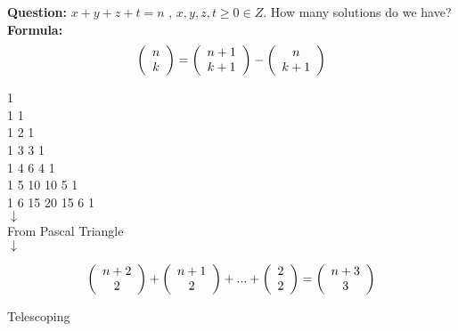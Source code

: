 \documentclass[11pt]{article}
\begin{document}
\textbf{Question: }  $x+y+z+t = n$ , $x,y,z,t \geq 0 \in Z$. How many solutions do we have?
\\ %

\textbf{Formula: }  $$\left( {\begin{array}{*{20}c} n  \\ k  \\ \end{array}} \right) = \left( {\begin{array}{*{20}c} n+1  \\ k+1  \\ \end{array}} \right) - \left( {\begin{array}{*{20}c} n  \\ k+1  \\ \end{array}} \right)$$

\begin{center}
1\\1 1\\1 2 1\\1 3 3 1\\1 4 6 4 1\\1 5 10 10 5 1\\1 6 15 20 15 6 1\\
$\downarrow$\\
From Pascal Triangle\\
$\downarrow$
\end{center}

$$\left( {\begin{array}{*{20}c} n+2  \\ 2  \\ \end{array}} \right) + \left( {\begin{array}{*{20}c} n+1  \\ 2  \\ \end{array}} \right) + ... + \left( {\begin{array}{*{20}c} 2  \\ 2  \\ \end{array}} \right) = \left( {\begin{array}{*{20}c} n+3 \\ 3  \\ \end{array}} \right)$$
\begin{center}
Telescoping
\end{center}
\end{document}
